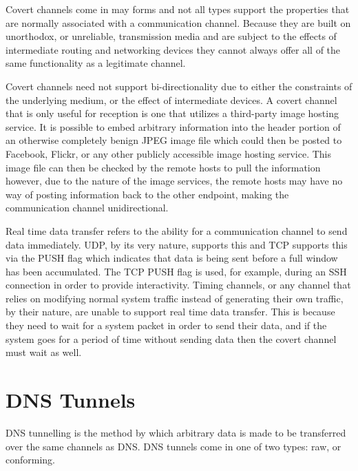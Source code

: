 \documentclass[12pt]{report}
\theoremstyle{remark}
\theoremstyle{definition}
\theoremstyle{definition}
\theoremstyle{definition}
\begin{document}
Covert channels come in may forms and not all types support the properties that
are normally associated with a communication channel. Because they are built on
unorthodox, or unreliable, transmission media and are subject to the effects of
intermediate routing and networking devices they cannot always offer all of the
same functionality as a legitimate channel.

Covert channels need not support bi-directionality due
to either the constraints of the underlying medium, or the effect of
intermediate devices. A covert channel that is only useful for reception is one
that utilizes a third-party image hosting service. It is possible to embed
arbitrary information into the header portion of an otherwise completely benign
JPEG image file which could then be posted to Facebook, Flickr, or any other
publicly accessible image hosting service. This image file can then be checked
by the remote
hosts to pull the information however, due to the nature of the image services,
the remote
hosts may have no
way of posting information back to the other endpoint, making the
communication channel unidirectional.

Real time data transfer refers to the ability
for a communication channel to send data immediately. UDP, by its very nature,
supports this and TCP supports this via the PUSH flag which indicates that data
is being sent before a full window has been accumulated. The TCP PUSH flag
is used, for example, during an SSH connection in order to provide
interactivity. Timing channels, or any channel that relies on modifying normal
system traffic instead of generating their own traffic, by their nature, are
unable to support real time data transfer. This is because they need to wait for
a system packet in order to send their data, and if the system goes for a period
of time without sending data then the covert channel must wait as well.

\section{DNS Tunnels}
\label{dnstunnels.types}

DNS tunnelling is the method by which arbitrary data is made to be transferred
over the same channels as DNS. DNS tunnels come in one of two types: raw, or
conforming.
\end{document}
